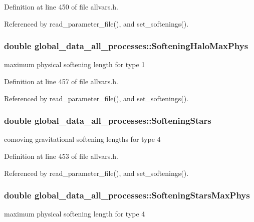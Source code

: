 Definition at line 450 of file allvars.h.



Referenced by read\_\-parameter\_\-file(), and set\_\-softenings().

\hypertarget{structglobal__data__all__processes_a1d4f323715e8df4ea4be9296348cca25}{
\subsubsection[{SofteningHaloMaxPhys}]{\setlength{\rightskip}{0pt plus 5cm}double {\bf global\_\-data\_\-all\_\-processes::SofteningHaloMaxPhys}}}
\label{structglobal__data__all__processes_a1d4f323715e8df4ea4be9296348cca25}
maximum physical softening length for type 1 

Definition at line 457 of file allvars.h.



Referenced by read\_\-parameter\_\-file(), and set\_\-softenings().

\hypertarget{structglobal__data__all__processes_a5502dc85fd165d33e9ba8d0f8c01867c}{
\subsubsection[{SofteningStars}]{\setlength{\rightskip}{0pt plus 5cm}double {\bf global\_\-data\_\-all\_\-processes::SofteningStars}}}
\label{structglobal__data__all__processes_a5502dc85fd165d33e9ba8d0f8c01867c}
comoving gravitational softening lengths for type 4 

Definition at line 453 of file allvars.h.



Referenced by read\_\-parameter\_\-file(), and set\_\-softenings().

\hypertarget{structglobal__data__all__processes_a7ace4652c6c05275e4fa28dfe6fb374e}{
\subsubsection[{SofteningStarsMaxPhys}]{\setlength{\rightskip}{0pt plus 5cm}double {\bf global\_\-data\_\-all\_\-processes::SofteningStarsMaxPhys}}}
\label{structglobal__data__all__processes_a7ace4652c6c05275e4fa28dfe6fb374e}
maximum physical softening length for type 4 

